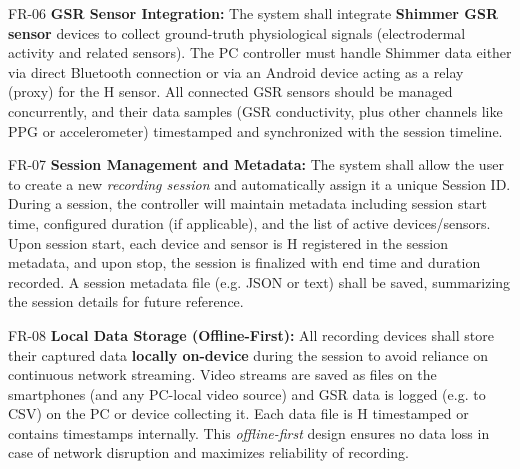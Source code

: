   FR-06                   \textbf{GSR Sensor Integration:} The system shall integrate \textbf{Shimmer GSR sensor} devices to collect ground-truth physiological signals (electrodermal activity and related sensors). The PC controller must handle Shimmer data either via direct Bluetooth connection or via an Android device acting as a relay (proxy) for the                                                     H
                          sensor\cite{AppleHealthWatch2019}. All connected GSR sensors should be managed concurrently, and their data samples (GSR conductivity, plus other channels like PPG or accelerometer) timestamped and synchronized with the session timeline.                             

  FR-07                   \textbf{Session Management and Metadata:} The system shall allow the user to create a new \textit{recording session} and automatically assign it a unique Session ID. During a session, the controller will maintain metadata including session start time, configured duration (if applicable), and the list of active devices/sensors. Upon session start, each device and sensor is         H
                          registered in the session metadata, and upon stop, the session is finalized with end time and duration                                                                                                                                                                                                                                                                             
                          recorded\cite{SamsungHealth2020}\cite{Fowles1981}. A session metadata file (e.g. JSON or      
                          text) shall be saved, summarizing the session details for future reference.                                                                                                                                                                                                                                                                                                        

  FR-08                   \textbf{Local Data Storage (Offline-First):} All recording devices shall store their captured data \textbf{locally on-device} during the session to avoid reliance on continuous network streaming. Video streams are saved as files on the smartphones (and any PC-local video source) and GSR data is logged (e.g. to CSV) on the PC or device collecting it. Each data file is            H
                          timestamped or contains timestamps internally. This \textit{offline-first} design ensures no data loss in case of network disruption and maximizes reliability of recording.                                                                                                                                                                                                              

